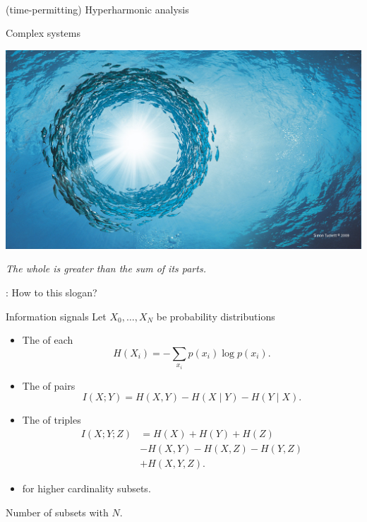 
\begin{frame}
	\centering
	\vspace*{2.6cm}
	\Huge{}\\
	{\large(time-permitting)}
	\vskip 20pt
	\Large{Hyperharmonic analysis}
\end{frame}

\begin{frame}{Complex systems}

	\includegraphics[scale=.23]{aux/fishes}

	\bigskip
	\textit{The whole is greater than the sum of its parts.}

	\pause\vskip 10pt
	: How to  this slogan?
\end{frame}

\begin{frame}{Information signals}
	\pause
	Let $X_0, \dots, X_N$ be probability distributions

	\vskip 5pt

	\begin{itemize}
		\pause\item The  of each
		\[
		\textstyle H(X_i) = - \sum_{x_i} p(x_i) \log p(x_i).
		\]
		\vspace*{-20pt}\pause\item The  of pairs
		\[
		I(X; Y) = H(X, Y) - H(X \mid Y) - H(Y \mid X).
		\]
		\vspace*{-20pt}\pause\item The  of triples
		\begin{align*}
			I(X;Y;Z) &=
			H(X) + H(Y) + H(Z) \\
			& - H(X,Y) - H(X,Z) - H(Y,Z) \\
			& + H(X,Y,Z).
		\end{align*}
		\vspace*{-20pt}\pause\item {} for higher cardinality subsets.
	\end{itemize}

	\vskip 10pt
	\pause

	 Number of subsets  with $N$.
\end{frame}

